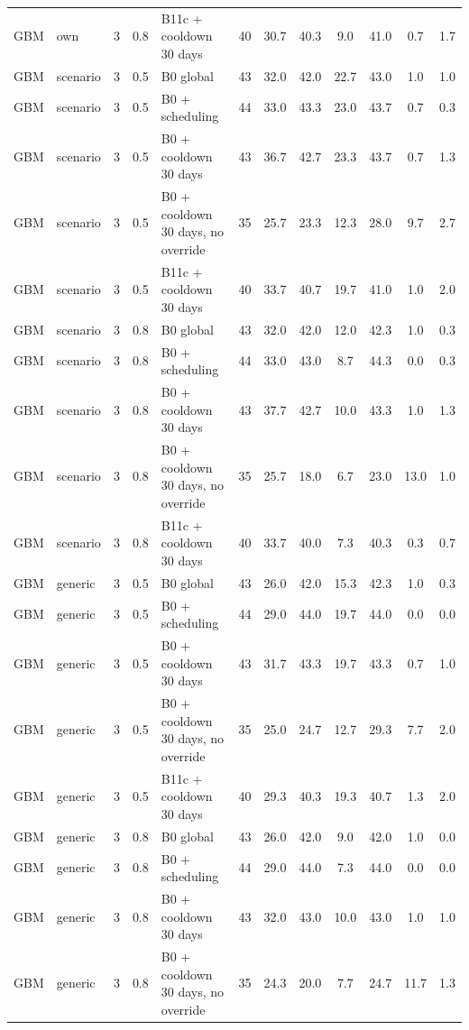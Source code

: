 \documentclass[10pt,onecolumn,letterpaper]{article}
\begin{document}
\begin{longtable}{lllllccccccc}
GBM & own & 3 & 0.8 & B11c + cooldown 30 days & 40 & 30.7 & 40.3 & 9.0 & 41.0 & 0.7 & 1.7 \\
GBM & scenario & 3 & 0.5 & B0 global & 43 & 32.0 & 42.0 & 22.7 & 43.0 & 1.0 & 1.0 \\
GBM & scenario & 3 & 0.5 & B0 + scheduling & 44 & 33.0 & 43.3 & 23.0 & 43.7 & 0.7 & 0.3 \\
GBM & scenario & 3 & 0.5 & B0 + cooldown 30 days & 43 & 36.7 & 42.7 & 23.3 & 43.7 & 0.7 & 1.3 \\
GBM & scenario & 3 & 0.5 & B0 + cooldown 30 days, no override & 35 & 25.7 & 23.3 & 12.3 & 28.0 & 9.7 & 2.7 \\
GBM & scenario & 3 & 0.5 & B11c + cooldown 30 days & 40 & 33.7 & 40.7 & 19.7 & 41.0 & 1.0 & 2.0 \\
GBM & scenario & 3 & 0.8 & B0 global & 43 & 32.0 & 42.0 & 12.0 & 42.3 & 1.0 & 0.3 \\
GBM & scenario & 3 & 0.8 & B0 + scheduling & 44 & 33.0 & 43.0 & 8.7 & 44.3 & 0.0 & 0.3 \\
GBM & scenario & 3 & 0.8 & B0 + cooldown 30 days & 43 & 37.7 & 42.7 & 10.0 & 43.3 & 1.0 & 1.3 \\
GBM & scenario & 3 & 0.8 & B0 + cooldown 30 days, no override & 35 & 25.7 & 18.0 & 6.7 & 23.0 & 13.0 & 1.0 \\
GBM & scenario & 3 & 0.8 & B11c + cooldown 30 days & 40 & 33.7 & 40.0 & 7.3 & 40.3 & 0.3 & 0.7 \\
GBM & generic & 3 & 0.5 & B0 global & 43 & 26.0 & 42.0 & 15.3 & 42.3 & 1.0 & 0.3 \\
GBM & generic & 3 & 0.5 & B0 + scheduling & 44 & 29.0 & 44.0 & 19.7 & 44.0 & 0.0 & 0.0 \\
GBM & generic & 3 & 0.5 & B0 + cooldown 30 days & 43 & 31.7 & 43.3 & 19.7 & 43.3 & 0.7 & 1.0 \\
GBM & generic & 3 & 0.5 & B0 + cooldown 30 days, no override & 35 & 25.0 & 24.7 & 12.7 & 29.3 & 7.7 & 2.0 \\
GBM & generic & 3 & 0.5 & B11c + cooldown 30 days & 40 & 29.3 & 40.3 & 19.3 & 40.7 & 1.3 & 2.0 \\
GBM & generic & 3 & 0.8 & B0 global & 43 & 26.0 & 42.0 & 9.0 & 42.0 & 1.0 & 0.0 \\
GBM & generic & 3 & 0.8 & B0 + scheduling & 44 & 29.0 & 44.0 & 7.3 & 44.0 & 0.0 & 0.0 \\
GBM & generic & 3 & 0.8 & B0 + cooldown 30 days & 43 & 32.0 & 43.0 & 10.0 & 43.0 & 1.0 & 1.0 \\
GBM & generic & 3 & 0.8 & B0 + cooldown 30 days, no override & 35 & 24.3 & 20.0 & 7.7 & 24.7 & 11.7 & 1.3 \\

\end{longtable}
\end{document}
